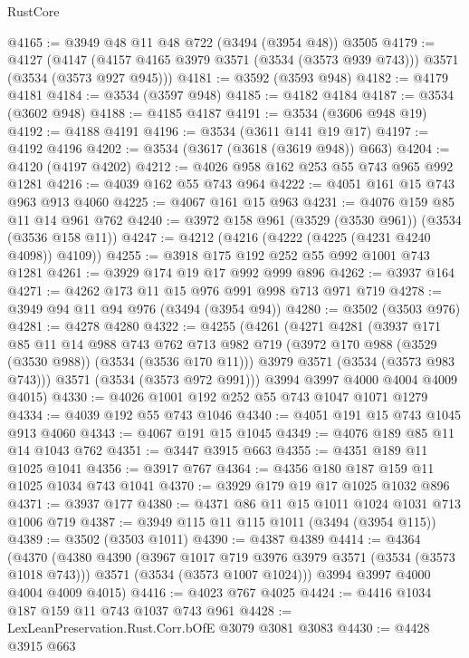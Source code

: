 \begin{lexlean}{RustCore}
\begin{coremodule}
@4165 := @3949 @48 @11 @48 @722 (@3494 (@3954 @48)) @3505
@4179 := @4127
    (@4147 (@4157 @4165 @3979 @3571 (@3534 (@3573 @939 @743))) @3571 (@3534 (@3573 @927 @945)))
@4181 := @3592 (@3593 @948)
@4182 := @4179 @4181
@4184 := @3534 (@3597 @948)
@4185 := @4182 @4184
@4187 := @3534 (@3602 @948)
@4188 := @4185 @4187
@4191 := @3534 (@3606 @948 @19)
@4192 := @4188 @4191
@4196 := @3534 (@3611 @141 @19 @17)
@4197 := @4192 @4196
@4202 := @3534 (@3617 (@3618 (@3619 @948)) @663)
@4204 := @4120 (@4197 @4202)
@4212 := @4026 @958 @162 @253 @55 @743 @965 @992 @1281
@4216 := @4039 @162 @55 @743 @964
@4222 := @4051 @161 @15 @743 @963 @913 @4060
@4225 := @4067 @161 @15 @963
@4231 := @4076 @159 @85 @11 @14 @961 @762
@4240 := @3972 @158 @961 (@3529 (@3530 @961)) (@3534 (@3536 @158 @11))
@4247 := @4212 (@4216 (@4222 (@4225 (@4231 @4240 @4098)) @4109))
@4255 := @3918 @175 @192 @252 @55 @992 @1001 @743 @1281
@4261 := @3929 @174 @19 @17 @992 @999 @896
@4262 := @3937 @164
@4271 := @4262 @173 @11 @15 @976 @991 @998 @713 @971 @719
@4278 := @3949 @94 @11 @94 @976 (@3494 (@3954 @94))
@4280 := @3502 (@3503 @976)
@4281 := @4278 @4280
@4322 := @4255
    (@4261
      (@4271
        @4281
        (@3937
          @171
          @85
          @11
          @14
          @988
          @743
          @762
          @713
          @982
          @719
          (@3972 @170 @988 (@3529 (@3530 @988)) (@3534 (@3536 @170 @11)))
          @3979
          @3571
          (@3534 (@3573 @983 @743)))
        @3571
        (@3534 (@3573 @972 @991)))
      @3994
      @3997
      @4000
      @4004
      @4009
      @4015)
@4330 := @4026 @1001 @192 @252 @55 @743 @1047 @1071 @1279
@4334 := @4039 @192 @55 @743 @1046
@4340 := @4051 @191 @15 @743 @1045 @913 @4060
@4343 := @4067 @191 @15 @1045
@4349 := @4076 @189 @85 @11 @14 @1043 @762
@4351 := @3447 @3915 @663
@4355 := @4351 @189 @11 @1025 @1041
@4356 := @3917 @767
@4364 := @4356 @180 @187 @159 @11 @1025 @1034 @743 @1041
@4370 := @3929 @179 @19 @17 @1025 @1032 @896
@4371 := @3937 @177
@4380 := @4371 @86 @11 @15 @1011 @1024 @1031 @713 @1006 @719
@4387 := @3949 @115 @11 @115 @1011 (@3494 (@3954 @115))
@4389 := @3502 (@3503 @1011)
@4390 := @4387 @4389
@4414 := @4364
    (@4370
      (@4380
        @4390
        (@3967 @1017 @719 @3976 @3979 @3571 (@3534 (@3573 @1018 @743)))
        @3571
        (@3534 (@3573 @1007 @1024)))
      @3994
      @3997
      @4000
      @4004
      @4009
      @4015)
@4416 := @4023 @767 @4025
@4424 := @4416 @1034 @187 @159 @11 @743 @1037 @743 @961
@4428 := LexLeanPreservation.Rust.Corr.bOfE @3079 @3081 @3083
@4430 := @4428 @3915 @663

\end{coremodule}
\end{lexlean}

